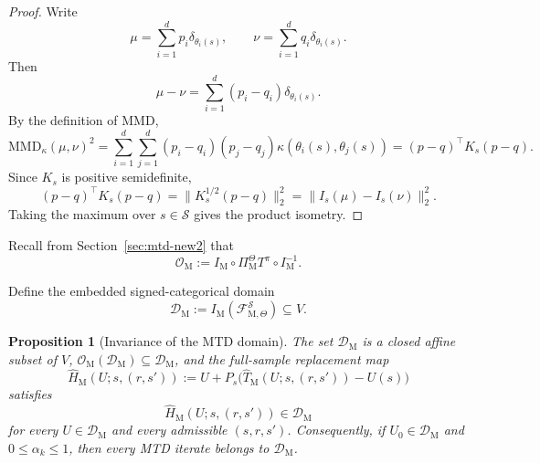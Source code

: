 \documentclass{article}
\newtheorem{proposition}[theorem]{Proposition}
\newcommand{\X}{\mathcal{S}}
\begin{document}
\begin{proof}
Write
\begin{equation}
\mu=\sum_{i=1}^d p_i\delta_{\theta_i(s)}, \qquad \nu=\sum_{i=1}^d q_i\delta_{\theta_i(s)}.
\end{equation}
Then
\begin{equation}
\mu-\nu=\sum_{i=1}^d (p_i-q_i)\delta_{\theta_i(s)}.
\end{equation}
By the definition of MMD,
\begin{equation}
\mathrm{MMD}_\kappa(\mu,\nu)^2 = \sum_{i=1}^d\sum_{j=1}^d (p_i-q_i)(p_j-q_j)\kappa(\theta_i(s),\theta_j(s)) = (p-q)^\top K_s(p-q).
\end{equation}
Since $K_s$ is positive semidefinite,
\begin{equation}
(p-q)^\top K_s(p-q) = \lVert K_s^{1/2}(p-q) \rVert_2^2 = \lVert I_s(\mu)-I_s(\nu) \rVert_2^2.
\end{equation}
Taking the maximum over $s\in \X$ gives the product isometry.
\end{proof}

Recall from Section~\ref{sec:mtd-new2} that
\begin{equation}
\mathcal O_{\mathrm M} := I_{\mathrm M}\circ \Pi_{\mathrm M}^{\Theta}T^\pi \circ I_{\mathrm M}^{-1}.
\end{equation}

Define the embedded signed-categorical domain
\begin{equation}
\mathcal D_{\mathrm M}:=I_{\mathrm M}(\mathcal F^{\X}_{\mathrm M,\Theta})\subseteq V.
\end{equation}

\begin{proposition}[Invariance of the MTD domain]
\label{prop:mtd-domain}
The set $\mathcal D_{\mathrm M}$ is a closed affine subset of $V$, $\mathcal O_{\mathrm M}(\mathcal D_{\mathrm M})\subseteq\mathcal D_{\mathrm M}$, and the full-sample replacement map
\begin{equation}
\widehat H_{\mathrm M}(U;s,(r,s')):=U+P_s\bigl(\widehat T_{\mathrm M}(U;s,(r,s'))-U(s)\bigr)
\end{equation}
satisfies
\begin{equation}
\widehat H_{\mathrm M}(U;s,(r,s'))\in\mathcal D_{\mathrm M}
\end{equation}
for every $U\in\mathcal D_{\mathrm M}$ and every admissible $(s,r,s')$. Consequently, if $U_0\in\mathcal D_{\mathrm M}$ and $0\le\alpha_k\le1$, then every MTD iterate belongs to $\mathcal D_{\mathrm M}$.
\end{proposition}
\end{document}
